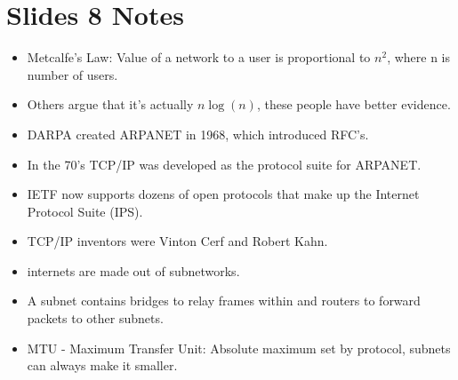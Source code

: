 \documentclass{scrartcl}
\begin{document}
\section*{Slides 8 Notes}
\begin{itemize}
\item Metcalfe's Law: Value of a network to a user is proportional to $n^2$,
 where n is number of users.
\item Others argue that it's actually $n\log(n)$, these people have better
 evidence.
\item DARPA created ARPANET in 1968, which introduced RFC's.
\item In the 70's TCP/IP was developed as the protocol suite for ARPANET.
\item IETF now supports dozens of open protocols that make up the Internet
 Protocol Suite (IPS).
\item TCP/IP inventors were Vinton Cerf and Robert Kahn.
\item internets are made out of subnetworks.
\item A subnet contains bridges to relay frames within and routers to forward
 packets to other subnets.
\item MTU - Maximum Transfer Unit: Absolute maximum set by protocol, subnets
 can always make it smaller.
\end{itemize}
\end{document}
